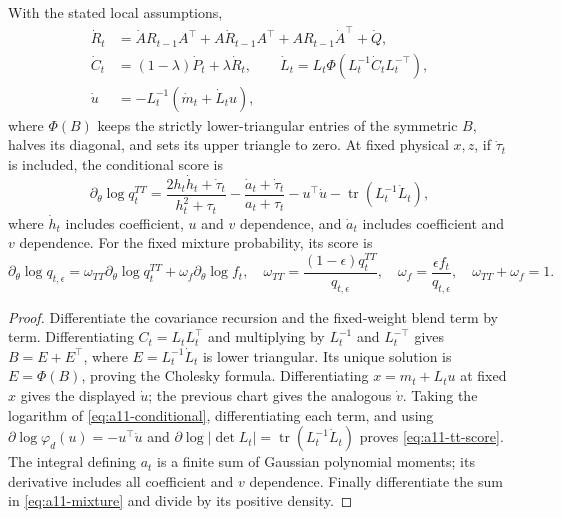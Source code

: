 \begin{proposition}
\label{prop:a11-derivative}
With the stated local assumptions,
\begin{align}
 \dot R_t&=\dot A R_{t-1}A^\top+A\dot R_{t-1}A^\top
             +AR_{t-1}\dot A^\top+\dot Q,\nonumber\\
 \dot C_t&=(1-\lambda)\dot P_t+\lambda\dot R_t,\qquad
 \dot L_t=L_t\Phi(L_t^{-1}\dot C_t L_t^{-\top}),\nonumber\\
 \dot u&=-L_t^{-1}(\dot m_t+\dot L_tu),
 \label{eq:a11-chart-derivative}
\end{align}
where $\Phi(B)$ keeps the strictly lower-triangular entries of the symmetric
$B$, halves its diagonal, and sets its upper triangle to zero. At fixed
physical $x,z$, if $\dot\tau_t$ is included, the conditional score is
\begin{equation}
 \partial_\theta\log q_t^{TT}=
 \frac{2h_t\dot h_t+\dot\tau_t}{h_t^2+\tau_t}
 -\frac{\dot a_t+\dot\tau_t}{a_t+\tau_t}
 -u^\top\dot u-\operatorname{tr}(L_t^{-1}\dot L_t),
 \label{eq:a11-tt-score}
\end{equation}
where $\dot h_t$ includes coefficient, $u$ and $v$ dependence, and
$\dot a_t$ includes coefficient and $v$ dependence. For the fixed mixture
probability, its score is
\begin{equation}
 \partial_\theta\log q_{t,\epsilon}
 =\omega_{TT}\partial_\theta\log q_t^{TT}
  +\omega_f\partial_\theta\log f_t,
 \quad
 \omega_{TT}=\frac{(1-\epsilon)q_t^{TT}}{q_{t,\epsilon}},\quad
 \omega_f=\frac{\epsilon f_t}{q_{t,\epsilon}},\quad
 \omega_{TT}+\omega_f=1.
 \label{eq:a11-mixture-score}
\end{equation}
\end{proposition}
\begin{proof}
Differentiate the covariance recursion and the fixed-weight blend term by
term. Differentiating $C_t=L_tL_t^\top$ and multiplying by $L_t^{-1}$ and
$L_t^{-\top}$ gives $B=E+E^\top$, where $E=L_t^{-1}\dot L_t$ is lower
triangular. Its unique solution is $E=\Phi(B)$, proving the Cholesky formula.
Differentiating $x=m_t+L_tu$ at fixed $x$ gives the displayed $\dot u$;
the previous chart gives the analogous $\dot v$.
Taking the logarithm of \eqref{eq:a11-conditional}, differentiating each
term, and using $\partial\log\varphi_d(u)=-u^\top\dot u$ and
$\partial\log|\det L_t|=\operatorname{tr}(L_t^{-1}\dot L_t)$ proves
\eqref{eq:a11-tt-score}. The integral defining $a_t$ is a finite sum of
Gaussian polynomial moments; its derivative includes all coefficient and
$v$ dependence. Finally differentiate the sum in
\eqref{eq:a11-mixture} and divide by its positive density.
\end{proof}

